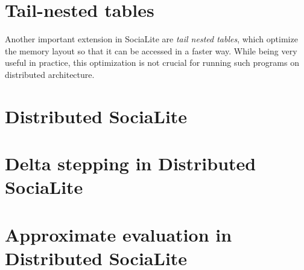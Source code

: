 \section{Tail-nested tables}\label{s:tnt}
Another important extension in SociaLite are \emph{tail nested tables}, which optimize the memory layout so that it can be accessed in a faster way. While being very useful in practice, this optimization is not crucial for running such programs on distributed architecture. 

\section{Distributed SociaLite}\label{s:distributed}

\section{Delta stepping in Distributed SociaLite}\label{s:deltastep}
\section{Approximate evaluation in Distributed SociaLite}\label{s:approxdist}



